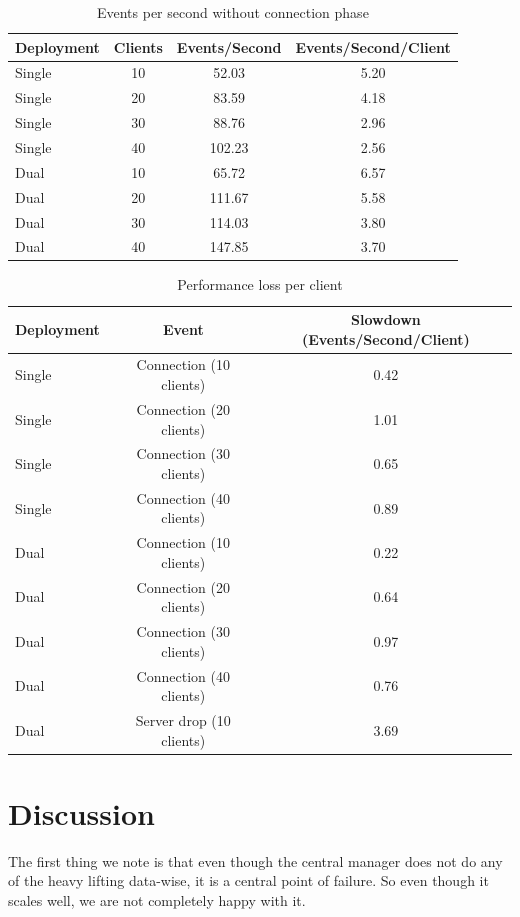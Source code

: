 \documentclass[a4paper,10pt]{article}
\begin{document}
\begin{table}
\centering
\begin{tabular}{| l | c | c | c |}
\hline
\textbf{Deployment} & \textbf{Clients} & \textbf{Events/Second}  & \textbf{Events/Second/Client} \\
\hline
\hline
Single & 10 & 52.03& 5.20\\
\hline
Single & 20 & 83.59& 4.18\\
\hline
Single & 30&88.76 & 2.96\\
\hline
Single & 40&102.23 & 2.56\\
\hline
\hline
Dual & 10 & 65.72&6.57 \\
\hline
Dual & 20 &111.67 &5.58 \\
\hline
Dual & 30 &  114.03&3.80 \\
\hline
Dual & 40 &147.85 &3.70 \\
\hline
\end{tabular}
\caption{Events per second without connection phase}
\label{tab:expeventswithout}
\end{table}

\begin{table}
\centering
\begin{tabular}{| l | c | c |}
\hline
\textbf{Deployment} & \textbf{Event} & \textbf{Slowdown (Events/Second/Client)} \\
\hline
\hline
Single & Connection (10 clients) & 0.42\\
\hline
Single & Connection (20 clients) & 1.01\\
\hline
Single & Connection (30 clients) & 0.65\\
\hline
Single & Connection (40 clients) & 0.89\\
\hline
Dual & Connection (10 clients) & 0.22\\
\hline
Dual & Connection (20 clients) & 0.64\\
\hline
Dual & Connection (30 clients) & 0.97\\
\hline
Dual & Connection (40 clients) & 0.76\\
\hline
Dual & Server drop (10 clients) & 3.69\\
\hline
\end{tabular}
\caption{Performance loss per client}
\label{tab:expaggregateloss}
\end{table}

\section{Discussion}
\label{sec:discussion}
The first thing we note is that even though the central manager does not do any of the heavy lifting data-wise, it is a central point of failure.
So even though it scales well, we are not completely happy with it.
\end{document}
